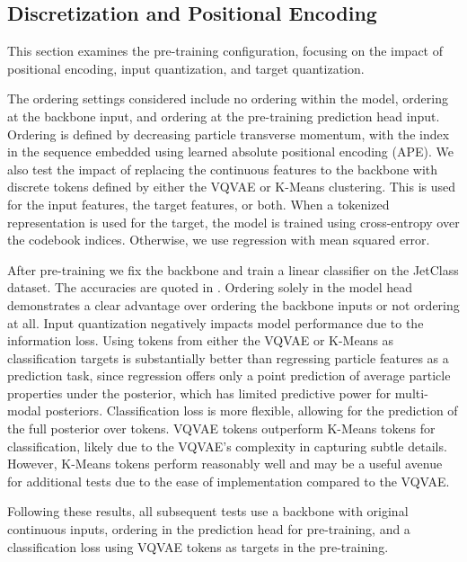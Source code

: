 \subsection{Discretization and Positional Encoding}

This section examines the pre-training configuration, focusing on the impact of positional encoding, input quantization, and target quantization.

The ordering settings considered include no ordering within the model, ordering at the backbone input, and ordering at the pre-training prediction head input.
Ordering is defined by decreasing particle transverse momentum, with the index in the sequence embedded using learned absolute positional encoding (APE).
We also test the impact of replacing the continuous features to the backbone with discrete tokens defined by either the VQVAE or K-Means clustering.
This is used for the input features, the target features, or both.
When a tokenized representation is used for the target, the model is trained using cross-entropy over the codebook indices. Otherwise, we use regression with mean squared error.

After pre-training we fix the backbone and train a linear classifier on the JetClass dataset.
The accuracies are quoted in .
Ordering solely in the model head demonstrates a clear advantage over ordering the backbone inputs or not ordering at all.
Input quantization negatively impacts model performance due to the information loss.
Using tokens from either the VQVAE or K-Means as classification targets is substantially better than regressing particle features as a prediction task, since regression offers only a point prediction of average particle properties under the posterior, which has limited predictive power for multi-modal posteriors.
Classification loss is more flexible, allowing for the prediction of the full posterior over tokens.
VQVAE tokens outperform K-Means tokens for classification, likely due to the VQVAE's complexity in capturing subtle details.
However, K-Means tokens perform reasonably well and may be a useful avenue for additional tests due to the ease of implementation compared to the VQVAE.

Following these results, all subsequent tests use a backbone with original continuous inputs, ordering in the prediction head for pre-training, and a classification loss using VQVAE tokens as targets in the pre-training.

